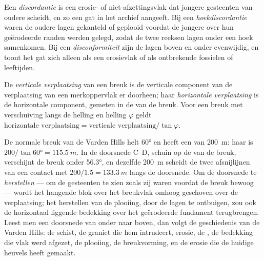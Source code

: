 \begin{definition}\label{def:b1:cross-sections:unconformity}
Een \emph{discordantie} is een erosie- of niet-afzettingsvlak dat jongere gesteenten van
oudere scheidt, en zo een gat in het archief aangeeft. Bij een \emph{hoekdiscordantie}
waren de oudere lagen gekanteld of geplooid voordat de jongere over hun geërodeerde randen werden gelegd, zodat de
twee reeksen lagen onder een hoek samenkomen. Bij een \emph{disconformiteit} zijn de lagen
boven en onder evenwijdig, en toont het gat zich alleen als een erosievlak of als ontbrekende fossielen of
leeftijden.
\end{definition}

\begin{definition}\label{def:b1:cross-sections:throw}
De \emph{verticale verplaatsing} van een breuk is de verticale component
van de verplaatsing van een merkoppervlak er doorheen; haar \emph{horizontale verplaatsing}
is de horizontale component, gemeten in de  van de breuk. Voor een breuk met verschuiving langs de helling
en helling $\varphi$ geldt $\text{horizontale verplaatsing} = \text{verticale verplaatsing}/\tan\varphi$.
\end{definition}

De normale breuk van de Varden Hills helt \ang{60} en heeft een  van \qty{200}{m}: haar
 is $200/\tan\ang{60} = \qty{115.5}{m}$. In de doorsnede C--D, schuin op de
 van de breuk, verschijnt de breuk onder \ang{56.3}, en dezelfde \qty{200}{m} 
scheidt de twee afsnijlijnen van een contact met $200/1.5 = \qty{133.3}{m}$ langs de doorsnede. Om de doorsnede te
\emph{herstellen} --- om de gesteenten te zien zoals zij waren voordat de breuk bewoog --- wordt het hangende blok over
het breukvlak omhoog geschoven over de verplaatsing; het herstellen van de plooiing, door de lagen te ontbuigen, zou
ook de horizontaal liggende bedekking over het geërodeerde fundament terugbrengen. Leest men een doorsnede van onder naar
boven, dan volgt de geschiedenis van de Varden Hills: de schist, de graniet die hem intrudeert, erosie, de ,
de bedekking die vlak werd afgezet, de plooiing, de breukvorming, en de erosie die de huidige heuvels heeft gemaakt.

